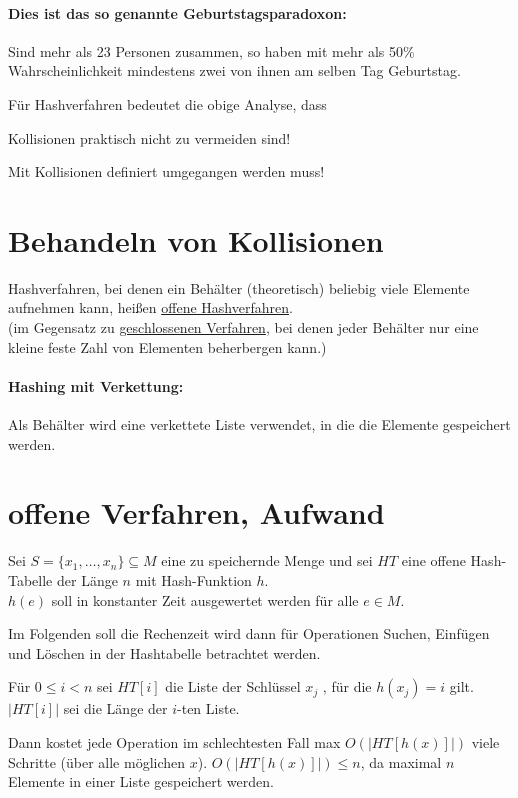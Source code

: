 \paragraph{Dies ist das so genannte {\flqq Geburtstagsparadoxon\frqq}:}
Sind mehr als 23 Personen zusammen, so haben mit mehr als 50\% Wahrscheinlichkeit mindestens zwei von ihnen am selben Tag Geburtstag.

Für Hashverfahren bedeutet die obige Analyse, dass
\begin{compactitem}
	\item Kollisionen praktisch nicht zu vermeiden sind!
	\item Mit Kollisionen definiert umgegangen werden muss!
\end{compactitem}

\section{Behandeln von Kollisionen}
Hashverfahren, bei denen ein Behälter (theoretisch) beliebig viele Elemente aufnehmen kann, heißen \ul{offene Hashverfahren}.\\
(im Gegensatz zu \ul{geschlossenen Verfahren}, bei denen jeder Behälter nur eine kleine feste Zahl von Elementen beherbergen kann.)

\paragraph{Hashing mit Verkettung:} Als Behälter wird eine verkettete Liste verwendet, in die die Elemente gespeichert werden.

\section{offene Verfahren, Aufwand}
Sei $S = \{x_1, \ldots, x_n\} \subseteq M$ eine zu speichernde Menge und sei $HT$ eine offene Hash-Tabelle der Länge $n$ mit Hash-Funktion $h$.\\
$h(e)$ soll in konstanter Zeit ausgewertet werden für alle $e \in M$.

Im Folgenden soll die Rechenzeit wird dann für Operationen Suchen, Einfügen und Löschen in der Hashtabelle betrachtet werden.

Für $0 \le i < n$ sei $HT[i]$ die Liste der Schlüssel $x_j$ , für die $h(x_j) = i$ gilt. $|HT[i]|$ sei die Länge der $i$-ten Liste.

Dann kostet jede Operation im schlechtesten Fall max $O(|HT[h(x)]|)$ viele Schritte (über alle möglichen $x$). $O(|HT[h(x)]|) \le n$, da maximal $n$ Elemente in einer Liste gespeichert werden.

